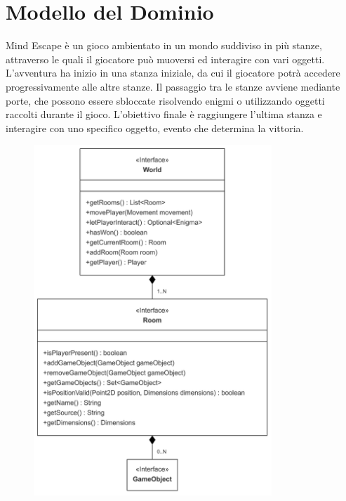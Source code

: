 \documentclass[a4paper,12pt]{report}
\begin{document}
\section{Modello del Dominio}

Mind Escape è un gioco ambientato in un mondo suddiviso in più stanze, attraverso le quali il giocatore può muoversi ed interagire con vari oggetti. 
L’avventura ha inizio in una stanza iniziale, da cui il giocatore potrà accedere progressivamente alle altre stanze. 
Il passaggio tra le stanze avviene mediante porte, che possono essere sbloccate risolvendo enigmi o utilizzando oggetti raccolti durante il gioco. L'obiettivo finale è raggiungere l’ultima stanza e interagire con uno specifico oggetto, evento che determina la vittoria.

\begin{figure}   %
    \centering
    \includegraphics[width=0.8\textwidth]{img/model.png}  %
    \label{img:model}
\end{figure}
\end{document}
